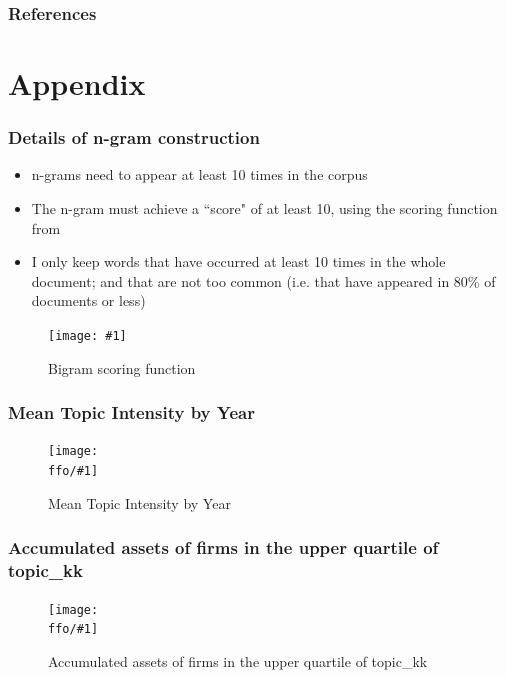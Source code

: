 \documentclass{beamer}
\newcommand{\ffo}{dicfullmc10thr10defnob40noa1_4t}
\newcommand{\insertfigurenoffo}[3]{
\begin{figure}[h!]
  \centering
  \texttt{[image: \#1]}
  \caption{#2}
  \label{fig:#1}
\end{figure}
}
\newcommand{\insertfigure}[2]{
\begin{figure}[h!]
  \centering
  \texttt{[image: \\ffo/\#1]}
  \centering
  \captionsetup{font=scriptsize}
  \caption{#2}
  \label{fig:#1}
\end{figure}
}
\begin{document}

\begin{frame}[allowframebreaks]
\frametitle{References}

\end{frame}

\section{Appendix}

\begin{frame}
\frametitle{Details of n-gram construction}
\label{ngram_details}
\begin{itemize}
\item n-grams need to appear at least 10 times in the corpus
\item The n-gram must achieve a ``score" of at least 10, using the scoring function from \cite{Mikolov2013-be} \hyperlink{ngram_main}{}
\item I only keep words that have occurred at least 10 times in the whole document; and that are not too common (i.e. that have appeared in 80\% of documents or less)
\end{itemize}
\insertfigurenoffo{mikolov_formula}{Bigram scoring function}{0.3}
\end{frame}

\begin{frame}
\frametitle{Mean Topic Intensity by Year}
\label{meantiy_details}
\hyperlink{results}{}
\insertfigure{mean_tiy}{Mean Topic Intensity by Year}
\end{frame}

\begin{frame}
\frametitle{Accumulated assets of firms in the upper quartile of topic\_kk}
\insertfigure{stackedplot_at}{Accumulated assets of firms in the upper quartile of topic\_kk}
\end{frame}
\end{document}
